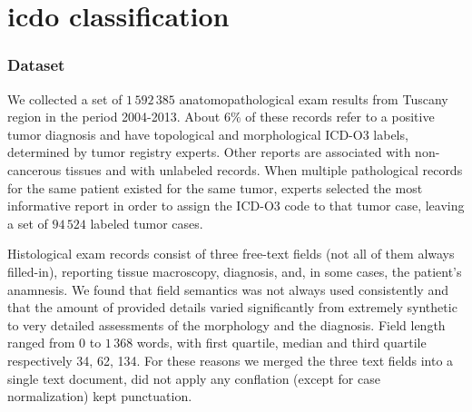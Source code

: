 \chapter{\ac{icdo} classification}
\label{ch:icdoFirst}
\subsection{Dataset}
\label{sec:dataset}
We collected a set of $1\,592\,385$ anatomopathological exam results
from Tuscany region in the period 2004-2013. About $6\%$
of these records refer to a positive tumor
diagnosis and have topological and morphological ICD-O3 labels,
determined by tumor registry experts. Other reports are associated
with non-cancerous tissues and with unlabeled records. When multiple
pathological records for the
same patient existed for the same tumor, experts selected the most
informative report in order to assign the ICD-O3 code to that tumor
case, leaving a set of $94\,524$ labeled tumor cases.

Histological exam records consist of three free-text fields (not all
of them always filled-in), reporting tissue macroscopy, diagnosis,
and, in some cases, the patient's anamnesis. We found that field
semantics was not always used consistently and that the amount of
provided details varied significantly from extremely synthetic to very
detailed assessments of the morphology and the diagnosis. Field length
ranged from $0$ to $1\,368$ words, with first quartile, median and
third quartile respectively 34, 62, 134. For these reasons we merged
the three text fields
into a single text document, did not apply any conflation (except for
case normalization) kept punctuation.



